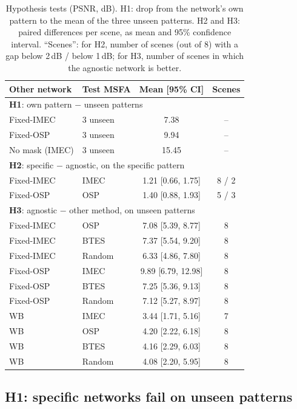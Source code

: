 \documentclass{article}
\begin{document}
\begin{table}[t]
\centering
\caption{Hypothesis tests (PSNR, dB). H1: drop from the network's own
pattern to the mean of the three unseen patterns. H2 and H3: paired
differences per scene, as mean and 95\% confidence interval. ``Scenes'':
for H2, number of scenes (out of 8) with a gap below 2\,dB / below 1\,dB;
for H3, number of scenes in which the agnostic network is better.}
\label{tab:hyp}
\footnotesize
\setlength{\tabcolsep}{4pt}
\begin{tabular}{|l|l|c|c|}
\hline
Other network & Test MSFA & Mean [95\% CI] & Scenes \\
\hline
\multicolumn{4}{|l|}{\textbf{H1}: own pattern $-$ unseen patterns} \\
\hline
Fixed-IMEC     & 3 unseen & 7.38  & -- \\
Fixed-OSP      & 3 unseen & 9.94  & -- \\
No mask (IMEC) & 3 unseen & 15.45 & -- \\
\hline
\multicolumn{4}{|l|}{\textbf{H2}: specific $-$ agnostic, on the specific pattern} \\
\hline
Fixed-IMEC & IMEC & 1.21 [0.66, 1.75] & 8 / 2 \\
Fixed-OSP  & OSP  & 1.40 [0.88, 1.93] & 5 / 3 \\
\hline
\multicolumn{4}{|l|}{\textbf{H3}: agnostic $-$ other method, on unseen patterns} \\
\hline
Fixed-IMEC & OSP    & 7.08 [5.39, 8.77]  & 8 \\
Fixed-IMEC & BTES   & 7.37 [5.54, 9.20]  & 8 \\
Fixed-IMEC & Random & 6.33 [4.86, 7.80]  & 8 \\
Fixed-OSP  & IMEC   & 9.89 [6.79, 12.98] & 8 \\
Fixed-OSP  & BTES   & 7.25 [5.36, 9.13]  & 8 \\
Fixed-OSP  & Random & 7.12 [5.27, 8.97]  & 8 \\
WB         & IMEC   & 3.44 [1.71, 5.16]  & 7 \\
WB         & OSP    & 4.20 [2.22, 6.18]  & 8 \\
WB         & BTES   & 4.16 [2.29, 6.03]  & 8 \\
WB         & Random & 4.08 [2.20, 5.95]  & 8 \\
\hline
\end{tabular}
\end{table}

\subsection{H1: specific networks fail on unseen patterns}
\end{document}
